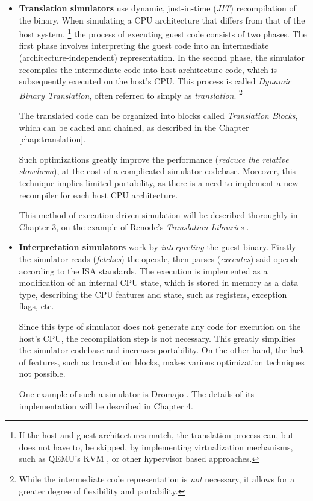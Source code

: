 \begin{itemize}
	\item{\textbf{Translation simulators} use dynamic, just-in-time (\textit{JIT}) recompilation of the binary.
	When simulating a CPU architecture that differs from that of the host system,%
	\footnote{If the host and guest architectures match, the translation process can, but does not have to, be skipped,
	by implementing virtualization mechanisms, such as QEMU's KVM \cite{QemuKVM}, or other hypervisor based approaches.}
	the process of executing guest code consists of two phases. The first phase involves interpreting the guest code into
	an intermediate (architecture-independent) representation.  In the second phase, the simulator recompiles the intermediate
	code into host architecture code, which is subsequently executed on the host's CPU. This process is called
	\textit{Dynamic Binary Translation}, often referred to simply as \textit{translation}.%
	\footnote{While the intermediate code representation is \textit{not} necessary, it allows for a greater degree of
	flexibility and portability.}

	The translated code can be organized into blocks called \textit{Translation Blocks}, which can be cached and
	chained, as described in the Chapter \ref{chap:translation}.

	Such optimizations greatly improve the performance (\textit{redcuce the relative slowdown}), at the
	cost of a complicated simulator codebase. Moreover, this technique implies limited portability, as there is a need
	to implement a new recompiler for each host CPU architecture.

	This method of execution driven simulation will be described thoroughly in Chapter 3, on the example of Renode's
	\textit{Translation Libraries} \cite{Tlib}.}
	\item{\textbf{Interpretation simulators} work by \textit{interpreting} the guest binary. Firstly the simulator
	reads (\textit{fetches}) the opcode, then parses (\textit{executes}) said opcode according to the ISA standards.
	The execution is implemented as a modification of an internal CPU state, which is stored in memory as a data type,
	describing the CPU features and state, such as registers, exception flags, etc.

	Since this type of simulator does not generate any code for execution on the host's CPU, the recompilation step is not
	necessary. This greatly simplifies the simulator codebase and increases portability. On the other hand, the lack of
	features, such as translation blocks, makes various optimization techniques not possible.

	One example of such a simulator is Dromajo \cite{Dromajo}. The details of its implementation will be described in
	Chapter 4.}
\end{itemize}


